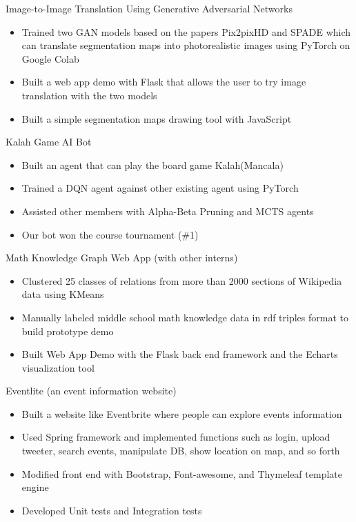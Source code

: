 \documentclass{resume}
\begin{document}
Image-to-Image Translation Using Generative Adversarial Networks
\begin{itemize}
    \item Trained two GAN models based on the papers Pix2pixHD and SPADE which can 
    translate segmentation maps into photorealistic images using PyTorch on Google Colab
    \item Built a web app demo with Flask that allows the user to try image translation with the two models
    \item Built a simple segmentation maps drawing tool with JavaScript
\end{itemize}


Kalah Game AI Bot
\begin{itemize}
    \item Built an agent that can play the board game Kalah(Mancala)
    \item Trained a DQN agent against other existing agent using PyTorch
    \item Assisted other members with Alpha-Beta Pruning and MCTS agents
    \item Our bot won the course tournament (\#1)
\end{itemize}


Math Knowledge Graph Web App (with other interns)
\begin{itemize}
    \item Clustered 25 classes of relations from more than 2000 sections of Wikipedia data using KMeans
    \item Manually labeled middle school math knowledge data in rdf triples format to build prototype demo
    \item Built Web App Demo with the Flask back end framework and the Echarts visualization tool
\end{itemize}


Eventlite (an event information website)
\begin{itemize}
    \item Built a website like Eventbrite where people can explore events information
    \item Used Spring framework and implemented functions such as login, upload tweeter, search events, manipulate DB, show location on map, and so forth
    \item Modified front end with Bootstrap, Font-awesome, and Thymeleaf template engine 
    \item Developed Unit tests and Integration tests
\end{itemize}
\end{document}
